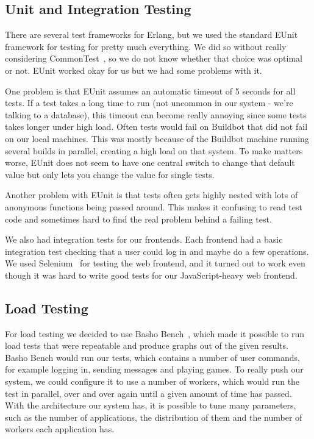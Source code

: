 \documentclass[11pt,a4paper]{report}
\begin{document}
\subsection{Unit and Integration Testing}
There are several test frameworks for Erlang, but we used the standard EUnit~\cite{eunit}
framework for testing for pretty much everything. We did so without really
considering CommonTest~\cite{commontest}, so we do not know whether that choice was optimal or
not. EUnit worked okay for us but we had some problems with it.

One problem is that EUnit assumes an automatic timeout of 5 seconds for all
tests. If a test takes a long time to run (not uncommon in our system - we're
talking to a database), this timeout can become really annoying since some tests
takes longer under high load. Often tests would fail on Buildbot that did not
fail on our local machines. This was mostly because of the Buildbot machine
running several builds in parallel, creating a high load on that system. To make
matters worse, EUnit does not seem to have one central switch to change that
default value but only lets you change the value for single tests.

Another problem with EUnit is that tests often gets highly nested with lots of
anonymous functions being passed around. This makes it confusing to read test
code and sometimes hard to find the real problem behind a failing test.

We also had integration tests for our frontends. Each frontend had a basic
integration test checking that a user could log in and maybe do a few
operations. We used Selenium~\cite{selenium} for testing the web frontend, and it turned out to
work even though it was hard to write good tests for our
JavaScript-heavy web frontend.
\subsection{Load Testing}
For load testing we decided to use Basho Bench~\cite{basho_bench}, which made it possible to run
load tests that were repeatable and produce graphs out of the given results.
Basho Bench would run our tests, which contains a number of user commands, for
example logging in, sending messages and playing games. To really push our
system, we could configure it to use a number of workers, which would run the
test in parallel, over and over again until a given amount of time has passed.
With the architecture our system has, it is possible to tune many parameters,
such as the number of applications, the distribution of them and the number of
workers each application has.
\end{document}
